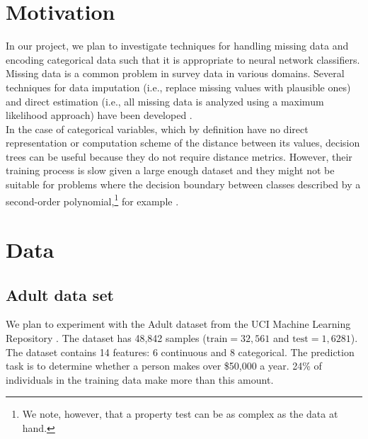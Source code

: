 \documentclass[12pt]{article}
\begin{document}
\maketitle

\section{Motivation}
In our project, we plan to investigate techniques for handling missing data and
encoding categorical data such that it is appropriate to neural network
classifiers. \\

Missing data is a common problem in survey data in various domains. Several
techniques for data imputation (i.e., replace missing values with plausible ones) and
direct estimation (i.e., all missing data is analyzed using a maximum likelihood
approach) have been developed \citep{de2003prevention}. \\

In the case of categorical variables, which by definition have no direct
representation or computation scheme of the distance between its values,
decision trees can be useful because they do not require distance metrics.
However, their training process is slow given a large enough dataset and they
might not be suitable for problems where the decision boundary between classes
described by a second-order polynomial,\footnote{We note, however, that a
property test can be as complex as the data at hand.} for
example \citep{fayyad1996data}. \\

\newpage
\section{Data}

\subsection{Adult data set}

We plan to experiment with the Adult dataset from the UCI Machine Learning Repository \citep{Lichman2013}. The dataset has 48,842 samples ($\mathrm{train}=32,561$ and $\mathrm{test}=1,6281$). The dataset contains 14 features: 6 continuous and 8 categorical. The prediction task is to determine whether a person makes over \$50,000 a year. 24\% of individuals in the training data make more than this amount. \\
\end{document}
